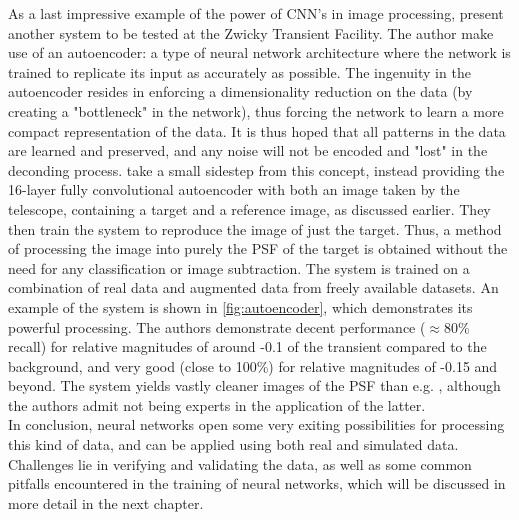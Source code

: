 As a last impressive example of the power of CNN's in image processing, \cite{autoencoder} present another system to be tested at the Zwicky Transient Facility. The author make use of an autoencoder: a type of neural network architecture where the network is trained to replicate its input as accurately as possible. The ingenuity in the autoencoder resides in enforcing a dimensionality reduction on the data (by creating a "bottleneck" in the network), thus forcing the network to learn a more compact representation of the data. It is thus hoped that all patterns in the data are learned and preserved, and any noise will not be encoded and "lost" in the deconding process. \cite{autoencoder} take a small sidestep from this concept, instead providing the 16-layer fully convolutional autoencoder with both an image taken by the telescope, containing a target and a reference image, as discussed earlier. They then train the system to reproduce the image of just the target. Thus, a method of processing the image into purely the PSF of the target is obtained without the need for any classification or image subtraction. The system is trained on a combination of real data and augmented data from freely available datasets. An example of the system is shown in \autoref{fig:autoencoder}, which demonstrates its powerful processing. The authors demonstrate decent performance ($\approx$80\% recall) for relative magnitudes of around -0.1 of the transient compared to the background, and very good (close to 100\%) for relative magnitudes of -0.15 and beyond. The system yields vastly cleaner images of the PSF than e.g. \cite{processingclassic}, although the authors admit not being experts in the application of the latter. \\

In conclusion, neural networks open some very exiting possibilities for processing this kind of data, and can be applied using both real and simulated data. Challenges lie in verifying and validating the data, as well as some common pitfalls encountered in the training of neural networks, which will be discussed in more detail in the next chapter.